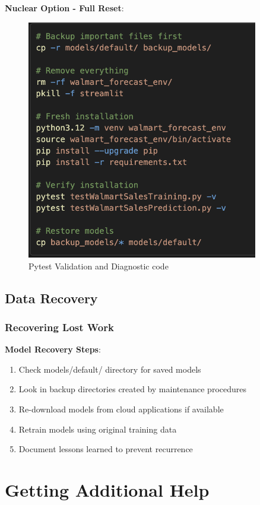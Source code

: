 \textbf{Nuclear Option - Full Reset}:
\begin{figure}[H]
	\centering
		\includegraphics[width=0.9\textwidth]{Images/08Troubleshooting/FullReset.png}
	\caption{Pytest Validation and Diagnostic code}
	\label{fig:FullReset}
\end{figure}
\subsection{Data Recovery}

\subsubsection{Recovering Lost Work}

\textbf{Model Recovery Steps}:
\begin{enumerate}
	\item Check models/default/ directory for saved models
	\item Look in backup directories created by maintenance procedures
	\item Re-download models from cloud applications if available
	\item Retrain models using original training data
	\item Document lessons learned to prevent recurrence
\end{enumerate}

\section{Getting Additional Help}

